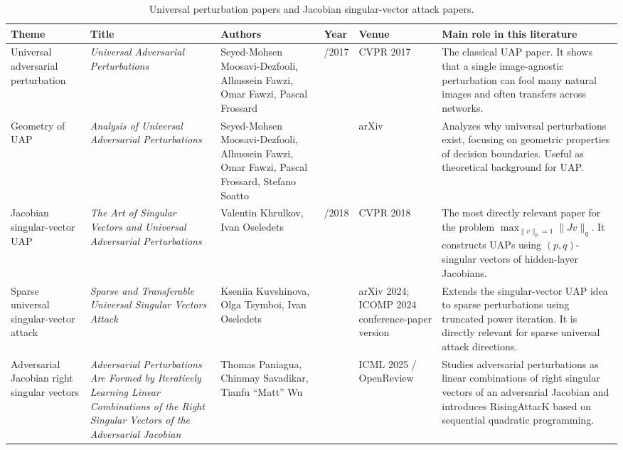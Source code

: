 \documentclass{article}
\begin{document}
\begin{landscape}
\begin{table}[p]
\centering
\footnotesize
\begin{tabular}{>{\raggedright\arraybackslash}p{2.4cm} >{\raggedright\arraybackslash}p{4.0cm} >{\raggedright\arraybackslash}p{3.4cm} >{\raggedright\arraybackslash}p{1.0cm} >{\raggedright\arraybackslash}p{3.2cm} >{\raggedright\arraybackslash}p{6.2cm}}
\hline
\textbf{Theme} & \textbf{Title} & \textbf{Authors} & \textbf{Year} & \textbf{Venue} & \textbf{Main role in this literature} \\
\hline
Universal adversarial perturbation &
\textit{Universal Adversarial Perturbations} &
Seyed-Mohsen Moosavi-Dezfooli, Alhussein Fawzi, Omar Fawzi, Pascal Frossard &
2016/2017 &
CVPR 2017 &
The classical UAP paper. It shows that a single image-agnostic perturbation can fool many natural images and often transfers across networks. \\
\hline
Geometry of UAP &
\textit{Analysis of Universal Adversarial Perturbations} &
Seyed-Mohsen Moosavi-Dezfooli, Alhussein Fawzi, Omar Fawzi, Pascal Frossard, Stefano Soatto &
2017 &
arXiv &
Analyzes why universal perturbations exist, focusing on geometric properties of decision boundaries. Useful as theoretical background for UAP. \\
\hline
Jacobian singular-vector UAP &
\textit{The Art of Singular Vectors and Universal Adversarial Perturbations} &
Valentin Khrulkov, Ivan Oseledets &
2017/2018 &
CVPR 2018 &
The most directly relevant paper for the problem
\(\max_{\|v\|_p=1}\|Jv\|_q\). It constructs UAPs using \((p,q)\)-singular vectors of hidden-layer Jacobians. \\
\hline
Sparse universal singular-vector attack &
\textit{Sparse and Transferable Universal Singular Vectors Attack} &
Kseniia Kuvshinova, Olga Tsymboi, Ivan Oseledets &
2024 &
arXiv 2024; ICOMP 2024 conference-paper version &
Extends the singular-vector UAP idea to sparse perturbations using truncated power iteration. It is directly relevant for sparse universal attack directions. \\
\hline
Adversarial Jacobian right singular vectors &
\textit{Adversarial Perturbations Are Formed by Iteratively Learning Linear Combinations of the Right Singular Vectors of the Adversarial Jacobian} &
Thomas Paniagua, Chinmay Savadikar, Tianfu ``Matt'' Wu &
2025 &
ICML 2025 / OpenReview &
Studies adversarial perturbations as linear combinations of right singular vectors of an adversarial Jacobian and introduces RisingAttacK based on sequential quadratic programming. \\
\hline
\end{tabular}
\caption{Universal perturbation papers and Jacobian singular-vector attack papers.}
\end{table}
\end{landscape}
\end{document}
